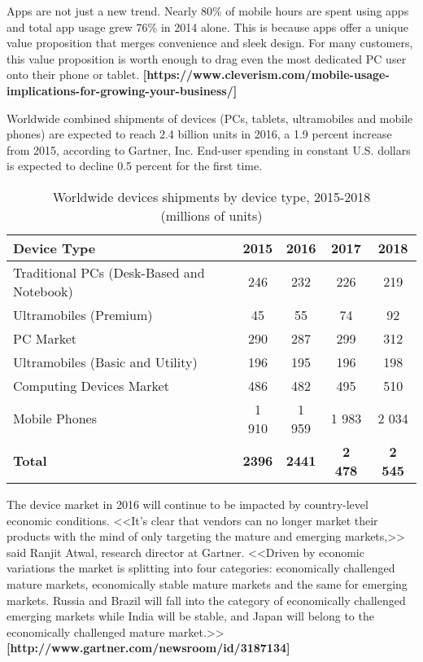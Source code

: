 Apps are not just a new trend. Nearly 80\% of mobile hours are spent
using apps and total app usage grew 76\% in 2014 alone. This is because apps
offer a unique value proposition that merges convenience and sleek design.
For many customers, this value proposition is worth enough to drag
even the most dedicated PC user onto their phone or tablet.
\textbf{[https://www.cleverism.com/mobile-usage-implications-for-growing-your-business/]}

Worldwide combined shipments of devices (PCs, tablets, ultramobiles
and mobile phones) are expected to reach 2.4 billion units in 2016, a 1.9 percent
increase from 2015, according to Gartner, Inc. End-user spending
in constant U.S. dollars is expected to decline 0.5 percent for the first time.

\begin{table} [h!]
  \caption{
    Worldwide devices shipments by device type, 2015-2018 \\
    \hspace{29.5mm} (millions of units)
  }\label{tbl:temp}
  \begin{tabular}{| m{9.8cm} | c | c | c | c |}
    \hline
    Device Type & 2015 & 2016 & 2017 & 2018 \\
    \hline

    Traditional PCs (Desk-Based and Notebook) & 246 & 232 & 226 & 219 \\
    \hline

    Ultramobiles (Premium) & 45 & 55 & 74 & 92 \\
    \hline

    PC Market & 290 & 287 & 299 & 312 \\
    \hline

    Ultramobiles (Basic and Utility) & 196 & 195 & 196 & 198 \\
    \hline

    Computing Devices Market & 486 & 482 & 495 & 510 \\
    \hline

    Mobile Phones & 1 910 & 1 959 & 1 983 & 2 034 \\
    \hline

    \textbf{Total} & \textbf{2396} & \textbf{2441} & \textbf{2 478} & \textbf{2 545} \\
    \hline

  \end{tabular}
\end{table}

The device market in 2016 will continue to be impacted by country-level economic
conditions. <<It’s clear that vendors can no longer market their products with
the mind of only targeting the mature and emerging markets,>> said Ranjit Atwal,
research director at Gartner. <<Driven by economic variations the market is
splitting into four categories: economically challenged mature markets,
economically stable mature markets and the same for emerging markets.
Russia and Brazil will fall into the category of economically challenged
emerging markets while India will be stable, and Japan will belong
to the economically challenged mature market.>>
\textbf{[http://www.gartner.com/newsroom/id/3187134]}






\pagebreak
